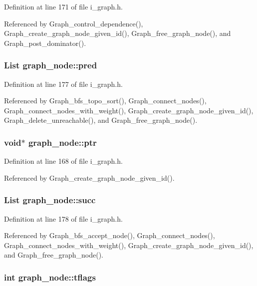 Definition at line 171 of file i\_\-graph.h.

Referenced by Graph\_\-control\_\-dependence(), Graph\_\-create\_\-graph\_\-node\_\-given\_\-id(), Graph\_\-free\_\-graph\_\-node(), and Graph\_\-post\_\-dominator().
\subsubsection{\setlength{\rightskip}{0pt plus 5cm}\bf{List} \bf{graph\_\-node::pred}}\label{structgraph__node_a955a5378f5609e34e172ae1c8fc77da}




Definition at line 177 of file i\_\-graph.h.

Referenced by Graph\_\-bfs\_\-topo\_\-sort(), Graph\_\-connect\_\-nodes(), Graph\_\-connect\_\-nodes\_\-with\_\-weight(), Graph\_\-create\_\-graph\_\-node\_\-given\_\-id(), Graph\_\-delete\_\-unreachable(), and Graph\_\-free\_\-graph\_\-node().
\subsubsection{\setlength{\rightskip}{0pt plus 5cm}void$\ast$ \bf{graph\_\-node::ptr}}\label{structgraph__node_d687549bf796d23281522dc93e2391b2}




Definition at line 168 of file i\_\-graph.h.

Referenced by Graph\_\-create\_\-graph\_\-node\_\-given\_\-id().
\subsubsection{\setlength{\rightskip}{0pt plus 5cm}\bf{List} \bf{graph\_\-node::succ}}\label{structgraph__node_18cb6837adff9af109814da72ff9ecfe}




Definition at line 178 of file i\_\-graph.h.

Referenced by Graph\_\-bfs\_\-accept\_\-node(), Graph\_\-connect\_\-nodes(), Graph\_\-connect\_\-nodes\_\-with\_\-weight(), Graph\_\-create\_\-graph\_\-node\_\-given\_\-id(), and Graph\_\-free\_\-graph\_\-node().
\subsubsection{\setlength{\rightskip}{0pt plus 5cm}int \bf{graph\_\-node::tflags}}\label{structgraph__node_d1ab37a105238db9b91987e5a3590e82}




